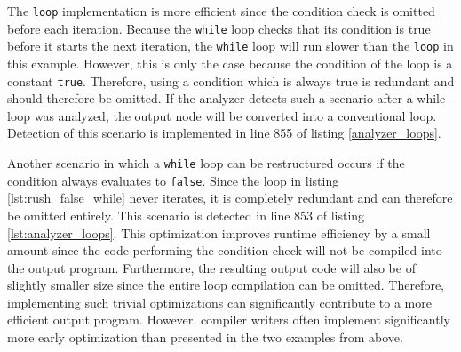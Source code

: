 The \texttt{loop} implementation is more efficient since the condition check is omitted before each iteration.
Because the \texttt{while} loop checks that its condition is true before it starts the next iteration,
the \texttt{while} loop will run slower than the \texttt{loop} in this example.
However, this is only the case because the condition of the loop is a constant \texttt{true}.
Therefore, using a condition which is always true is redundant and should therefore be omitted.
If the analyzer detects such a scenario after a while-loop was analyzed, the output node will be converted into a conventional loop.
Detection of this scenario is implemented in line 855 of listing \ref{analyzer_loops}.


Another scenario in which a \texttt{while} loop can be restructured occurs if the condition always evaluates to \texttt{false}.
Since the loop in listing \ref{lst:rush_false_while} never iterates, it is completely redundant and can therefore be omitted entirely.
This scenario is detected in line 853 of listing \ref{lst:analyzer_loops}.
This optimization improves runtime efficiency by a small amount since the code performing the condition check will not be compiled into the output program.
Furthermore, the resulting output code will also be of slightly smaller size since the entire loop compilation can be omitted.
Therefore, implementing such trivial optimizations can significantly contribute to a more efficient output program.
However, compiler writers often implement significantly more early optimization than presented in the two examples from above.
